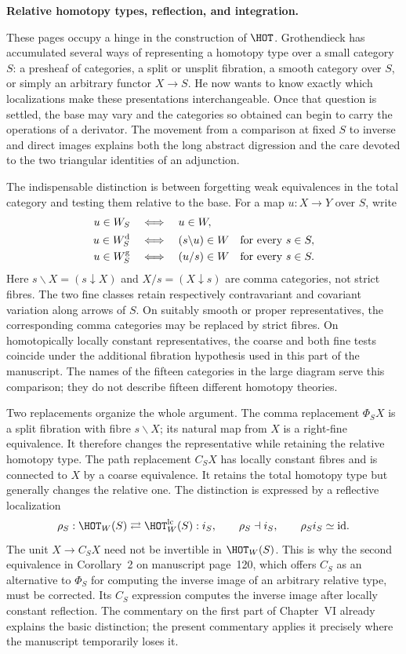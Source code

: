 \begingroup
{}
\noindent\textbf{Relative homotopy types, reflection, and integration.}

These pages occupy a hinge in the construction of $\HOT$. Grothendieck has accumulated several ways of representing a homotopy type over a small category $S$: a presheaf of categories, a split or unsplit fibration, a smooth category over $S$, or simply an arbitrary functor $X\to S$. He now wants to know exactly which localizations make these presentations interchangeable. Once that question is settled, the base may vary and the categories so obtained can begin to carry the operations of a derivator. The movement from a comparison at fixed $S$ to inverse and direct images explains both the long abstract digression and the care devoted to the two triangular identities of an adjunction.

The indispensable distinction is between forgetting weak equivalences in the total category and testing them relative to the base. For a map $u:X\to Y$ over $S$, write
\[
\begin{aligned}
u\in W_S&\quad\Longleftrightarrow\quad u\in W,\\
u\in W_S^{\mathrm d}&\quad\Longleftrightarrow\quad
 (s\backslash u)\in W\quad\hbox{for every }s\in S,\\
u\in W_S^{\mathrm g}&\quad\Longleftrightarrow\quad
 (u/s)\in W\quad\hbox{for every }s\in S.
\end{aligned}
\]
Here $s\backslash X=(s\downarrow X)$ and $X/s=(X\downarrow s)$ are comma categories, not strict fibres. The two fine classes retain respectively contravariant and covariant variation along arrows of $S$. On suitably smooth or proper representatives, the corresponding comma categories may be replaced by strict fibres. On homotopically locally constant representatives, the coarse and both fine tests coincide under the additional fibration hypothesis used in this part of the manuscript. The names of the fifteen categories in the large diagram serve this comparison; they do not describe fifteen different homotopy theories.

Two replacements organize the whole argument. The comma replacement $\Phi_SX$ is a split fibration with fibre $s\backslash X$; its natural map from $X$ is a right-fine equivalence. It therefore changes the representative while retaining the relative homotopy type. The path replacement $C_SX$ has locally constant fibres and is connected to $X$ by a coarse equivalence. It retains the total homotopy type but generally changes the relative one. The distinction is expressed by a reflective localization
\[
\rho_S:\HOT_W(S)\rightleftarrows\HOT_W^{\mathrm{lc}}(S):i_S,
\qquad \rho_S\dashv i_S,
\qquad \rho_Si_S\simeq\mathrm{id}.
\]
The unit $X\to C_SX$ need not be invertible in $\HOT_W(S)$. This is why the second equivalence in Corollary~2 on manuscript page~120, which offers $C_S$ as an alternative to $\Phi_S$ for computing the inverse image of an arbitrary relative type, must be corrected. Its $C_S$ expression computes the inverse image after locally constant reflection. The commentary on the first part of Chapter~VI already explains the basic distinction; the present commentary applies it precisely where the manuscript temporarily loses it.

